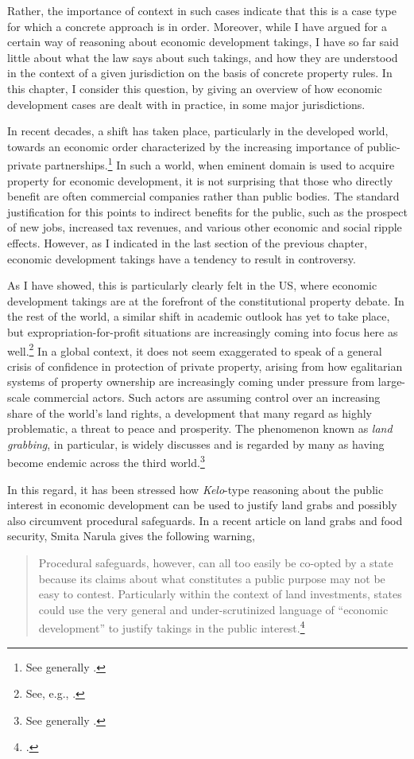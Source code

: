 Rather, the importance of context in such cases indicate that this is a case type for which a concrete approach is in order. Moreover, while I have argued for a certain way of reasoning about economic development takings, I have so far said little about what the law says about such takings, and how they are understood in the context of a given jurisdiction on the basis of concrete property rules.  In this chapter, I consider this question, by giving an overview of how economic development cases are dealt with in practice, in some major jurisdictions. 

In recent decades, a shift has taken place, particularly in the developed world, towards an economic order characterized by the increasing importance of public-private partnerships.\footnote{See generally \cite{saussier13}.} In such a world, when eminent domain is used to acquire property for economic development, it is not surprising that those who directly benefit are often commercial companies rather than public bodies. The standard justification for this points to indirect benefits for the public, such as the prospect of new jobs, increased tax revenues, and various other economic and social ripple effects. However, as I indicated in the last section of the previous chapter, economic development takings have a tendency to result in controversy.

As I have showed, this is particularly clearly felt in the US, where economic development takings are at the forefront of the constitutional property debate. In the rest of the world, a similar shift in academic outlook has yet to take place, but expropriation-for-profit situations are increasingly coming into focus here as well.\footnote{See, e.g., \cite{waring13,verstappen14}.} In a global context, it does not seem exaggerated to speak of a general crisis of confidence in protection of private property, arising from how egalitarian systems of property ownership are increasingly coming under pressure from large-scale commercial actors. Such actors are assuming control over an increasing share of the world's land rights, a development that many regard as highly problematic, a threat to peace and prosperity. The phenomenon known as {\it land grabbing}, in particular, is widely discusses and is regarded by many as having become endemic across the third world.\footnote{See generally \cite{borras11}.}

In this regard, it has been stressed how {\it Kelo}-type reasoning about the public interest in economic development can be used to justify land grabs and possibly also circumvent procedural safeguards. In a recent article on land grabs and food security, Smita Narula gives the following warning, 
\begin{quote}
Procedural safeguards, however, can all too easily be co-opted by a state because its claims about what constitutes a public purpose may not be easy to contest. Particularly within the context of land investments, states could use the very general and under-scrutinized language of ``economic development'' to justify takings in the public
interest.\footcite[157]{narula13}
\end{quote}

